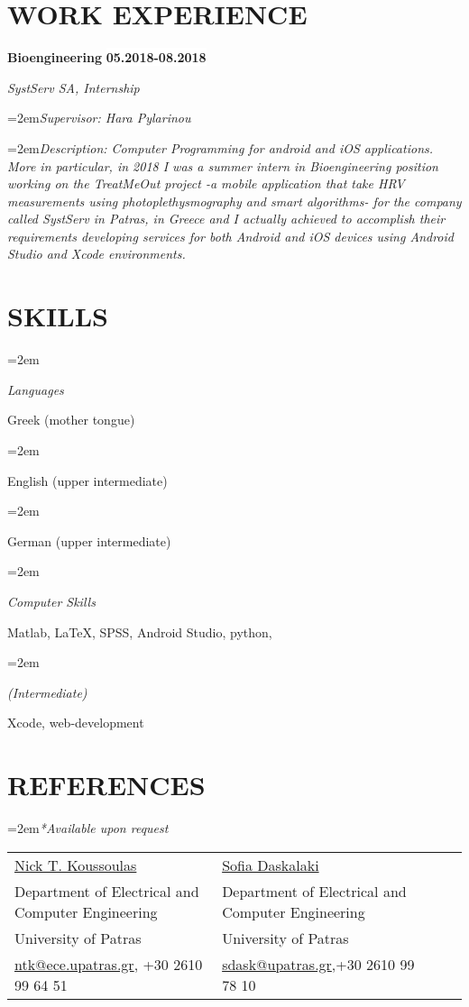 \documentclass[paper=a4,fontsize=11pt]{scrartcl} %
\newlength{\spacebox}
\newcommand{\sepspace}{\vspace*{1em}}		%
\newcommand{\NewPart}[1]{\section*{\large \uppercase{#1}}}
\newcommand{\PersonalEntry}[2]{
		\noindent\hangindent=2em\hangafter=0 %
		\parbox{\spacebox}{        %
		\textit{#1}}		       %
		\hspace{1.5em} #2 \par}    %
\newcommand{\EducationEntry}[6]{
		\noindent \textbf{#1} \hfill      %
		\colorbox{White}{%
			\parbox{8em}{%
			\hfill\color{Black}\textbf{#2}}} \par  %
		\noindent \textit{#3} \par        %
		\noindent\hangindent=2em\hangafter=0\textit{#4}\par %
		\noindent\hangindent=2em\hangafter=0\textit{#5}\par %
		\noindent\hangindent=2em\hangafter=0\textit{#6} %
		\normalsize \par}
\newcommand{\WorkEntry}[5]{				  %
		\noindent \textbf{#1} \hfill      %
		\colorbox{White}{\color{Black}\textbf{#2}} \par  %
		\noindent \textit{#3} \par              %
		\noindent\hangindent=2em\hangafter=0\textit{#4}\par %
		\noindent\hangindent=2em\hangafter=0\textit{#5} %
		\normalsize \par}
\newcommand{\SkillsEntry}[2]{      %
		\noindent\hangindent=2em\hangafter=0 %
		\parbox{8em}{        %
		\textit{#1}}			   %
		\hspace{1.5em} #2 \par}    %
\newcommand{\ReferenceEntry}[1]{
		 \noindent\hangindent=2em\hangafter=0\textit{#1} \\[0.5cm]     %
		 }
\begin{document}
\NewPart{Work experience}{}

\WorkEntry{Bioengineering}{05.2018-08.2018}{SystServ SA, Internship}
{Supervisor: Hara Pylarinou}{Description: Computer Programming for android and iOS applications. More in particular, in 2018 I was a summer intern in Bioengineering position working on the TreatMeOut project -a mobile application that take HRV measurements using photoplethysmography and smart algorithms- for the company called SystServ in Patras, in Greece and I actually achieved to accomplish their requirements developing services for both Android and iOS devices using Android Studio and Xcode environments.}
\sepspace

\NewPart{Skills}{}

\SkillsEntry{Languages}{Greek (mother tongue)}
\SkillsEntry{}{English (upper intermediate)}
\SkillsEntry{}{German (upper intermediate)}

\SkillsEntry{Computer Skills}{Matlab, \LaTeX, SPSS, Android Studio, python,}
\SkillsEntry{\textit{\small{(Intermediate)}}}{Xcode, web-development}

\NewPart{References}{}

\ReferenceEntry{*Available upon request}
\begin{tabular}{@{}V{0.5\columnwidth}V{0.5\columnwidth}l l}
\href{http://www.sml.ee.upatras.gr/Personnel/Faculty/Koussoulas.aspx}{Nick T. Koussoulas } & \href{http://www.ece.upatras.gr/en/personnel/faculty.html?id=900}{Sofia Daskalaki} \\
 Department of Electrical and Computer Engineering &  Department of Electrical and Computer Engineering  \\
 University of Patras &  University of Patras \\
\small{\href{mailto:ntk@ece.upatras.gr}{ntk@ece.upatras.gr}, +30 2610 99 64 51} & \small{\href{mailto:sdask@upatras.gr}{sdask@upatras.gr},+30 2610 99 78 10} \\
\end{tabular}
\end{document}
